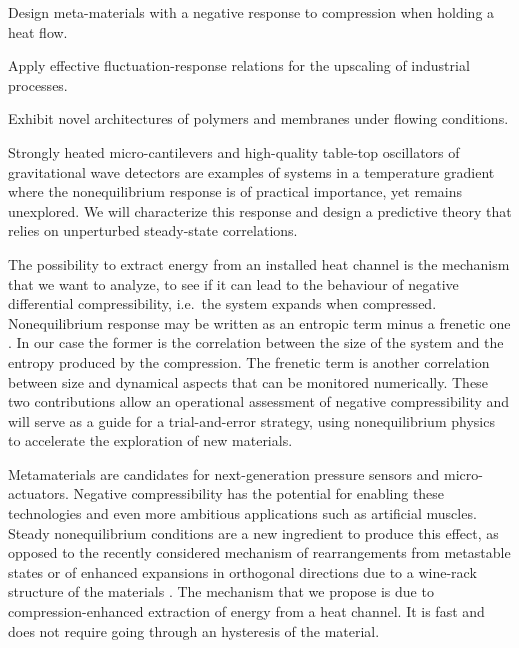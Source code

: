 \begin{workpackage}[id=WPcompress,wphases=0-48,
  short=Nonequilibrium compressibility, %
  title=Nonequilibrium compressibility, %
  lead=UNIPD,
  UNIPDRM=72,
  KULRM=12]

\newrefsection

\begin{wpobjectives}
  \begin{compactitem}
  \item Design meta-materials with a negative response to compression when holding a heat flow.
  \item Apply effective fluctuation-response relations for the upscaling of industrial processes.
  \item Exhibit novel architectures of polymers and membranes under flowing conditions.
  \end{compactitem}
\end{wpobjectives}

\begin{wpdescription}

Strongly heated micro-cantilevers \cite{AGBB15} and high-quality table-top oscillators of
gravitational wave detectors \cite{Cet13} are examples of systems in a temperature gradient
where the nonequilibrium response is of practical importance, yet remains unexplored.
%
We will characterize this response and design a predictive theory that relies on unperturbed
steady-state correlations.

The possibility to extract energy from an installed heat channel is the mechanism that we want to
analyze, to see if it can lead to the behaviour of negative differential compressibility,
i.e.~the system expands when compressed. 
Nonequilibrium response may be written as an entropic term minus a frenetic one \cite{BMW09}.
In our case the former is the correlation between the size of the system and the entropy produced by the compression.
The frenetic term is another correlation between size and dynamical aspects that can be monitored numerically.
%
These two contributions allow an operational assessment of negative compressibility and will
serve as a guide for a trial-and-error strategy, using nonequilibrium physics to accelerate the
exploration of new materials.

Metamaterials \cite{NM12,CG15} are candidates for next-generation pressure sensors and
micro-actuators. Negative compressibility has the potential for enabling these technologies
and even more ambitious applications such as artificial muscles.
%
Steady nonequilibrium conditions are a new ingredient to produce this effect, as opposed to the recently considered
mechanism of rearrangements from metastable states \cite{NM12} or of enhanced expansions in orthogonal directions
due to a wine-rack structure of the materials \cite{CG15}.
%
The mechanism that we propose is due to compression-enhanced extraction of energy from a
heat channel. It is fast and does not require going through an hysteresis of the material.


\end{wpdescription}
\end{workpackage}
